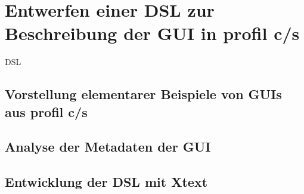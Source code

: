 \chapter{Entwerfen einer DSL zur Beschreibung der GUI in profil
c/s}\label{Entwerfen einer DSL zur Beschreibung der GUI in profil c/s}
\gls{DSL}
\section{Vorstellung elementarer Beispiele von GUIs aus profil c/s}
\section{Analyse der Metadaten der GUI}
\section{Entwicklung der DSL mit Xtext}